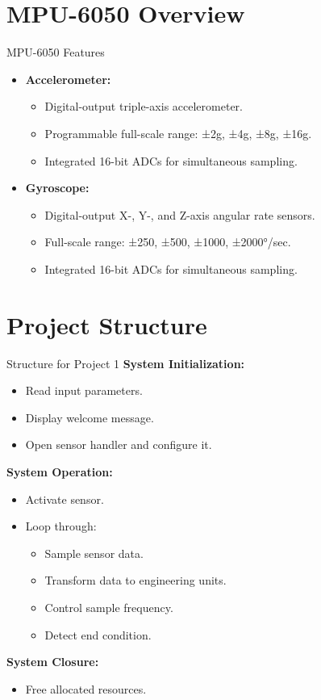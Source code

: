 \section{MPU-6050 Overview}
\begin{frame}{MPU-6050 Features}
    \begin{itemize}
        \item \textbf{Accelerometer:}
        \begin{itemize}
            \item Digital-output triple-axis accelerometer.
            \item Programmable full-scale range: ±2g, ±4g, ±8g, ±16g.
            \item Integrated 16-bit ADCs for simultaneous sampling.
        \end{itemize}
        \item \textbf{Gyroscope:}
        \begin{itemize}
            \item Digital-output X-, Y-, and Z-axis angular rate sensors.
            \item Full-scale range: ±250, ±500, ±1000, ±2000°/sec.
            \item Integrated 16-bit ADCs for simultaneous sampling.
        \end{itemize}
    \end{itemize}
\end{frame}

\section{Project Structure}
\begin{frame}{Structure for Project 1}
    \textbf{System Initialization:}
    \begin{itemize}
        \item Read input parameters.
        \item Display welcome message.
        \item Open sensor handler and configure it.
    \end{itemize}
    \textbf{System Operation:}
    \begin{itemize}
        \item Activate sensor.
        \item Loop through:
        \begin{itemize}
            \item Sample sensor data.
            \item Transform data to engineering units.
            \item Control sample frequency.
            \item Detect end condition.
        \end{itemize}
    \end{itemize}
    \textbf{System Closure:}
    \begin{itemize}
        \item Free allocated resources.
    \end{itemize}
\end{frame}


